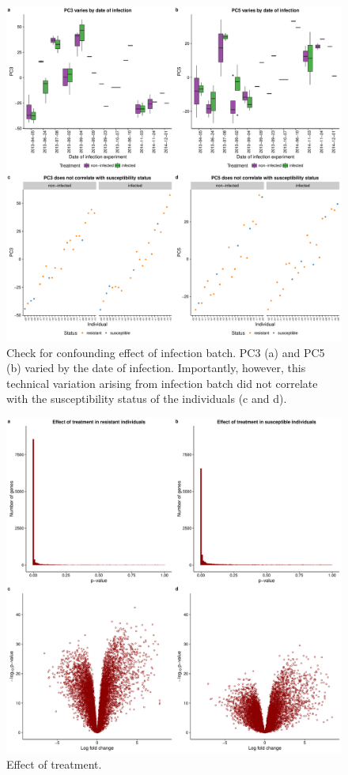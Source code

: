 \documentclass[fleqn,10pt]{wlscirep}
\begin{document}
\begin{figure}[ht]
\centering
\includegraphics[width=\linewidth]{../figure/batch-infection.pdf}
\caption{
Check for confounding effect of infection batch. PC3 (a) and PC5 (b) varied by the date of infection. Importantly, however, this technical variation arising from infection batch did not correlate with the susceptibility status of the individuals (c and d).
}
\label{fig:infection}
\end{figure}

\begin{figure}[ht]
\centering
\includegraphics[width=\linewidth]{../figure/limma-supp.pdf}
\caption{
Effect of treatment.
}
\label{fig:limma-supp}
\end{figure}
\end{document}
